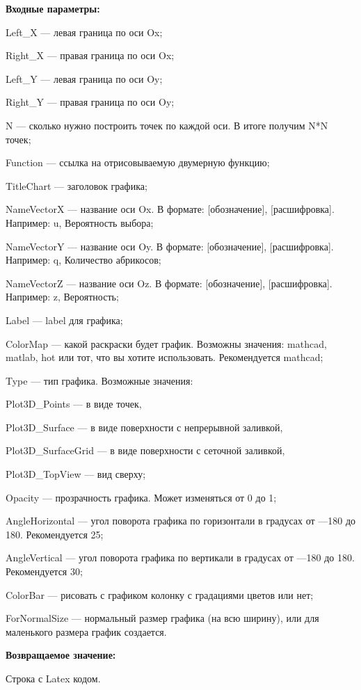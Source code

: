 \textbf{Входные параметры:}

Left\_X --- левая граница по оси Ox;
 
    Right\_X --- правая граница по оси Ox;
 
    Left\_Y --- левая граница по оси Oy;
 
    Right\_Y --- правая граница по оси Oy;
 
    N --- сколько нужно построить точек по каждой оси. В итоге получим N*N точек;
 
    Function --- ссылка на отрисовываемую двумерную функцию;
 
    TitleChart --- заголовок графика;
 
    NameVectorX --- название оси Ox. В формате: [обозначение], [расшифровка]. Например: u, Вероятность выбора;
 
    NameVectorY --- название оси Oy. В формате: [обозначение], [расшифровка]. Например: q, Количество абрикосов;
 
    NameVectorZ --- название оси Oz. В формате: [обозначение], [расшифровка]. Например: z, Вероятность;
 
    Label --- label для графика;
 
    ColorMap --- какой раскраски будет график. Возможны значения: mathcad, matlab, hot или тот, что вы хотите использовать. Рекомендуется mathcad;
 
    Type --- тип графика. Возможные значения:
 
       Plot3D\_Points --- в виде точек,
 
       Plot3D\_Surface --- в виде поверхности с непрерывной заливкой,
 
       Plot3D\_SurfaceGrid --- в виде поверхности с сеточной заливкой,
 
       Plot3D\_TopView --- вид сверху;
 
    Opacity --- прозрачность графика. Может изменяться от 0 до 1;
 
    AngleHorizontal --- угол поворота графика по горизонтали в градусах от ---180 до 180. Рекомендуется 25;
 
    AngleVertical --- угол поворота графика по вертикали в градусах от ---180 до 180. Рекомендуется 30;
 
    ColorBar --- рисовать с графиком колонку с градациями цветов или нет;
 
    ForNormalSize --- нормальный размер графика (на всю ширину), или для маленького размера график создается.

\textbf{Возвращаемое значение:}

Строка с Latex кодом.